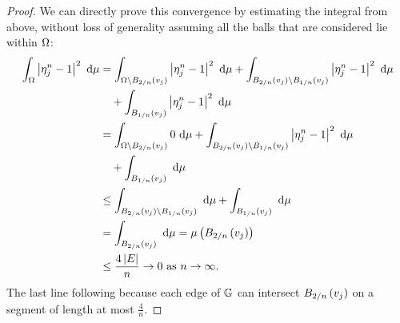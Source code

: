 \begin{proof}
	We can directly prove this convergence by estimating the integral from above, without loss of generality assuming all the balls that are considered lie within $\Omega$:
	\begin{align*}
		\begin{split}
			\int_{\Omega}\left\lvert \eta_j^n-1 \right\rvert^2 \ \mathrm{d}\mu 
			&= \int_{\Omega\setminus B_{2/n}\left( v_j \right)}\left\lvert \eta_j^n-1 \right\rvert^2 \ \mathrm{d}\mu 
			+ \int_{B_{2/n}\left( v_j \right) \setminus B_{1/n}\left( v_j \right)}\left\lvert \eta_j^n-1 \right\rvert^2 \ \mathrm{d}\mu \\ 
			&\quad + \int_{B_{1/n}\left( v_j \right)}\left\lvert \eta_j^n-1 \right\rvert^2 \ \mathrm{d}\mu \\
			&= \int_{\Omega\setminus B_{2/n}\left( v_j \right)}0 \ \mathrm{d}\mu + \int_{B_{2/n}\left( v_j \right) \setminus B_{1/n}\left( v_j \right)}\left\lvert \eta_j^n-1 \right\rvert^2 \ \mathrm{d}\mu \\ 
			&\quad + \int_{B_{1/n}\left( v_j \right)} \ \mathrm{d}\mu \\
			&\leq \int_{B_{2/n}\left( v_j \right) \setminus B_{1/n}\left( v_j \right)} \ \mathrm{d}\mu 
			+ \int_{B_{1/n}\left( v_j \right)} \ \mathrm{d}\mu \\
			&= \int_{B_{2/n}\left( v_j \right)} \ \mathrm{d}\mu 
			= \mu\left( B_{2/n}\left( v_j \right) \right) \\
			&\leq \frac{4 \left\lvert E \right\rvert}{n} \rightarrow0 \ \text{as} \ n \rightarrow\infty.
		\end{split}
	\end{align*}
	The last line following because each edge of $\mathbb{G}$ can intersect $B_{2/n}\left( v_j \right)$ on a segment of length at most $\frac{4}{n}$.
\end{proof}

